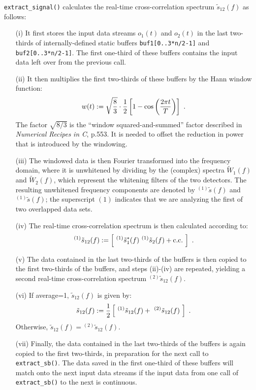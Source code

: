 {\tt extract\_signal()} calculates the real-time cross-correlation 
spectrum $\tilde s_{12}(f)$ as follows:
%
\begin{itemize}
\item[(i)] It first stores the input data streams $o_1(t)$ and
$o_2(t)$ in the last
two-thirds of internally-defined static buffers
{\tt buf1[0..3*n/2-1]} and {\tt buf2[0..3*n/2-1]}.
The first one-third of these buffers contains the input data left
over from the previous call.
%
\item[(ii)] It then multiplies the first two-thirds of these buffers
by the Hann window function:
%
\begin{equation}
w(t):=\sqrt{{8\over 3}}\cdot{1\over 2}
\left[1-\cos\left({2\pi t\over T}\right)\right]\ .
\end{equation}
%
The factor $\sqrt{8/3}$ is the ``window squared-and-summed'' factor
described in {\it Numerical Recipes in C}, p.553.
It is needed to offset the reduction in power that is introduced by
the windowing.
%
\item[(iii)] The windowed data is then Fourier transformed into the
frequency domain, where it is unwhitened by dividing by the (complex)
spectra $\tilde W_1(f)$ and $\tilde W_2(f)$, which represent the 
whitening filters of the two detectors.
The resulting unwhitened frequency components are denoted by
${}^{(1)}\tilde s(f)$ and ${}^{(1)}\tilde s(f)$; 
the superscript $(1)$ indicates that we are analyzing the first of 
two overlapped data sets.
%
\item[(iv)] The real-time cross-correlation spectrum is then calculated
according to:
%
\begin{equation}
{}^{(1)}\tilde s_{12}(f):=\left[\ 
{}^{(1)}\tilde s_1^*(f)\ {}^{(1)}\tilde s_2(f) + {\rm c.c.}\ \right]\ .
\end{equation}
%
\item[(v)] The data contained in the last two-thirds of the buffers is 
then copied to the first two-thirds of the buffers, and steps (ii)-(iv) 
are repeated, yielding a second real-time cross-correlation spectrum 
${}^{(2)}\tilde s_{12}(f)$.
%
\item[(vi)] If {average=1}, $\tilde s_{12}(f)$ is given by:
%
\begin{equation}
\tilde s_{12}(f):={1\over 2}\left[\ {}^{(1)}\tilde s_{12}(f)+
\ {}^{(2)}\tilde s_{12}(f)\ \right]\ .
\end{equation}
%
Otherwise, $\tilde s_{12}(f)={}^{(2)}\tilde s_{12}(f)$.
%
\item[(vii)] Finally, the data contained in the last two-thirds of the
buffers is again copied to the first two-thirds, in preparation for the
next call to {\tt extract\_sb()}.
The data saved in the first one-third of these buffers will match 
onto the next input data streams if the input data from one call of 
{\tt extract\_sb()} to the next is continuous.
\end{itemize}

